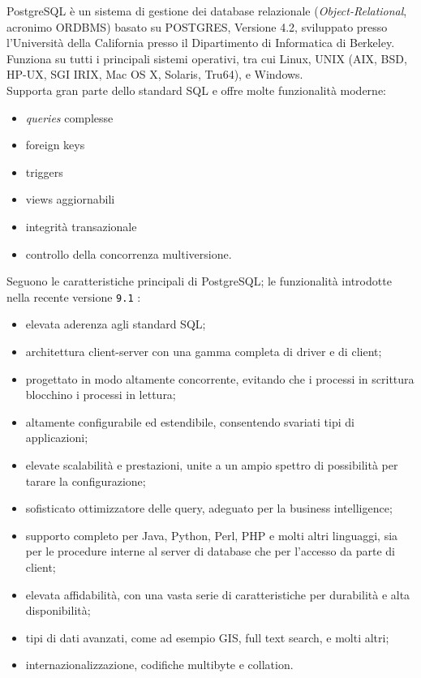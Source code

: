PostgreSQL \`{e} un sistema di gestione dei database relazionale (\textit{Object-Relational}, acronimo ORDBMS) basato su POSTGRES, Versione 4.2, sviluppato presso l'Universit\`{a} della California presso il Dipartimento di Informatica di Berkeley.\cite{etichetta15}\\
Funziona su tutti i principali sistemi operativi, tra cui Linux, UNIX (AIX, BSD, HP-UX, SGI IRIX, Mac OS X, Solaris, Tru64), e Windows.\cite{etichetta15}\\

Supporta gran parte dello standard SQL e offre molte funzionalit\`{a} moderne:
\begin{itemize}
\item 
\textit{queries} complesse
\item
foreign keys
\item
triggers
\item
views aggiornabili
\item
integrit\`{a} transazionale
\item
controllo della concorrenza multiversione.
\end{itemize}


Seguono le caratteristiche principali di PostgreSQL; le funzionalit\`{a} introdotte nella recente versione \verb"9.1" :
\begin{itemize}
\item 
elevata aderenza agli standard SQL;
\item 
architettura client-server con una gamma completa di driver e di client;
\item 
progettato in modo altamente concorrente, evitando che i processi in scrittura blocchino i processi in lettura;
\item 
altamente configurabile ed estendibile, consentendo svariati tipi di applicazioni;
\item 
elevate scalabilit\`{a} e prestazioni, unite a un ampio spettro di possibilit\`{a} per tarare la configurazione;
\item 
sofisticato ottimizzatore delle query, adeguato per la business intelligence;
\item 
supporto completo per Java, Python, Perl, PHP e molti altri linguaggi, sia per le procedure interne al server di database che per l'accesso da parte di client;
\item 
elevata affidabilit\`{a}, con una vasta serie di caratteristiche per durabilit\`{a} e alta disponibilit\`{a};
\item 
tipi di dati avanzati, come ad esempio GIS, full text search, e molti altri;
\item 
internazionalizzazione, codifiche multibyte e collation. \cite{etichetta12}
\end{itemize}\\

